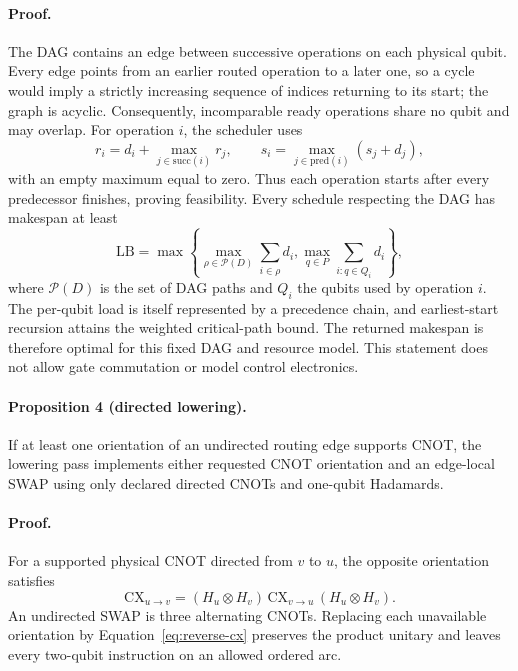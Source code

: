 \documentclass[conference]{IEEEtran}
\begin{document}
\paragraph{Proof.}
The DAG contains an edge between successive operations on each physical qubit.
Every edge points from an earlier routed operation to a later one, so a cycle
would imply a strictly increasing sequence of indices returning to its start;
the graph is acyclic. Consequently, incomparable ready operations share no
qubit and may overlap.
For operation $i$, the scheduler uses
{\large
\begin{equation}
 r_i=d_i+\max_{j\in\mathrm{succ}(i)}r_j,
 \qquad
 s_i=\max_{j\in\mathrm{pred}(i)}(s_j+d_j),
 \label{eq:schedule}
\end{equation}
}
with an empty maximum equal to zero. Thus each operation starts after every
predecessor finishes, proving feasibility. Every schedule respecting the DAG
has makespan at least
{\large
\begin{equation}
 \mathrm{LB}=\max\!\left\{
 \max_{\rho\in\mathcal P(D)}\sum_{i\in\rho}d_i,
 \max_{q\in P}\sum_{i:q\in Q_i}d_i
 \right\},
 \label{eq:schedule-lower-bound}
\end{equation}
}
where $\mathcal P(D)$ is the set of DAG paths and $Q_i$ the qubits used by
operation $i$. The per-qubit load is itself represented by a precedence chain,
and earliest-start recursion attains the weighted critical-path bound. The
returned makespan is therefore optimal for this fixed DAG and resource model.
This statement does not allow gate commutation or model control electronics.

\paragraph{Proposition 4 (directed lowering).}
If at least one orientation of an undirected routing edge supports CNOT, the
lowering pass implements either requested CNOT orientation and an edge-local
SWAP using only declared directed CNOTs and one-qubit Hadamards.

\paragraph{Proof.}
For a supported physical CNOT directed from $v$ to $u$, the opposite
orientation satisfies
{\large
\begin{equation}
 \mathrm{CX}_{u\rightarrow v}
 =(H_u\otimes H_v)\,
 \mathrm{CX}_{v\rightarrow u}\,
 (H_u\otimes H_v).
 \label{eq:reverse-cx}
\end{equation}
}
An undirected SWAP is three alternating CNOTs. Replacing each unavailable
orientation by Equation~\eqref{eq:reverse-cx} preserves the product unitary
and leaves every two-qubit instruction on an allowed ordered arc.
\end{document}
